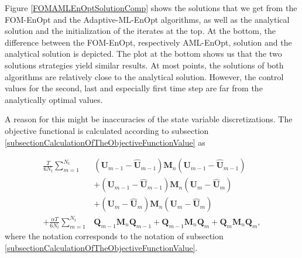 Figure \ref{FOMAMLEnOptSolutionComp} shows the solutions that we get from the FOM-EnOpt and the Adaptive-ML-EnOpt algorithms, as well as the analytical solution and the initialization of the iterates at the top. At the bottom, the difference between the FOM-EnOpt, respectively AML-EnOpt, solution and the analytical solution is depicted. The plot at the bottom shows us that the two solutions strategies yield similar results. At most points, the solutions of both algorithms are relatively close to the analytical solution. However, the control values for the second, last and especially first time step are far from the analytically optimal values.

A reason for this might be inaccuracies of the state variable discretizations. The objective functional is calculated according to subsection \ref{subsectionCalculationOfTheObjectiveFunctionValue} as

\begin{equation}
\label{discretizedObjectiveFunctionalRep}
\begin{aligned}
\frac{T}{6N_t}\sum_{m=1}^{N_t}&\left(\mathbf{U}_{m-1}-\hat{\mathbf{U}}_{m-1}\right)\mathbf{M}_n\left(\mathbf{U}_{m-1}-\hat{\mathbf{U}}_{m-1}\right)\\
&+ \left(\mathbf{U}_{m-1}-\hat{\mathbf{U}}_{m-1}\right)\mathbf{M}_n\left(\mathbf{U}_{m}-\hat{\mathbf{U}}_{m}\right)\\
&+ \left(\mathbf{U}_{m}-\hat{\mathbf{U}}_{m}\right)\mathbf{M}_n\left(\mathbf{U}_{m}-\hat{\mathbf{U}}_{m}\right)\\
+ \frac{\alpha T}{6N_t}\sum_{m=1}^{N_t}&\mathbf{Q}_{m-1}\mathbf{M}_n\mathbf{Q}_{m-1} + \mathbf{Q}_{m-1}\mathbf{M}_n\mathbf{Q}_{m} + \mathbf{Q}_{m}\mathbf{M}_n\mathbf{Q}_{m},
\end{aligned}
\end{equation}
where the notation corresponds to the notation of subsection \ref{subsectionCalculationOfTheObjectiveFunctionValue}.

